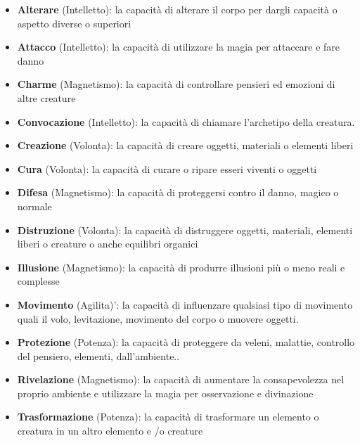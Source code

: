 \documentclass[a4paper,11pt,twoside,openany]{book}
\begin{document}
\begin{itemize}

	\item
	      \textbf{Alterare} (Intelletto): la capacità di alterare il corpo per dargli capacità o aspetto diverse o superiori
	\item
	      \textbf{Attacco} (Intelletto): la capacità di utilizzare la magia per attaccare e fare danno
	\item
	      \textbf{Charme} (Magnetismo): la capacità di controllare pensieri
	      ed emozioni di altre creature
	\item
	      \textbf{Convocazione} (Intelletto): la capacità di chiamare l'archetipo
	      della creatura.
	\item
	      \textbf{Creazione} (Volonta): la capacità di creare oggetti, materiali o elementi liberi
	\item
	      \textbf{Cura} (Volonta): la capacità di curare o ripare esseri viventi o oggetti
	\item
	      \textbf{Difesa} (Magnetismo): la capacità di proteggersi contro il danno, magico o normale
	\item
	      \textbf{Distruzione} (Volonta): la capacità di distruggere oggetti, materiali, elementi liberi o creature o anche equilibri organici
	\item
	      \textbf{Illusione} (Magnetismo): la capacità di produrre illusioni più o meno reali e complesse
	\item
	      \textbf{Movimento} (Agilita)': la capacità di influenzare qualsiasi tipo di movimento quali il volo, levitazione, movimento del corpo o muovere oggetti.
	\item
	      \textbf{Protezione} (Potenza): la capacità di proteggere da veleni, malattie, controllo del pensiero, elementi, dall'ambiente..
	\item
	      \textbf{Rivelazione} (Magnetismo): la capacità di aumentare la consapevolezza nel proprio ambiente e utilizzare la magia per osservazione e divinazione
	\item
	      \textbf{Trasformazione} (Potenza): la capacità di trasformare un elemento o creatura in un altro elemento e /o creature

\end{itemize}

\bigskip
\end{document}
